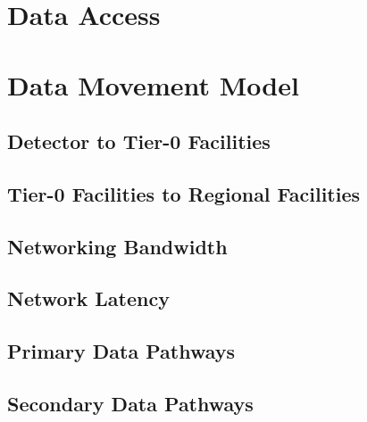 \section{Data Access} 

\section{Data Movement Model}

\subsection{Detector to Tier-0 Facilities}

\subsection{Tier-0 Facilities to Regional Facilities}

\subsection{Networking Bandwidth}

\subsection{Network Latency}

\subsection{Primary Data Pathways}

\subsection{Secondary Data Pathways}

